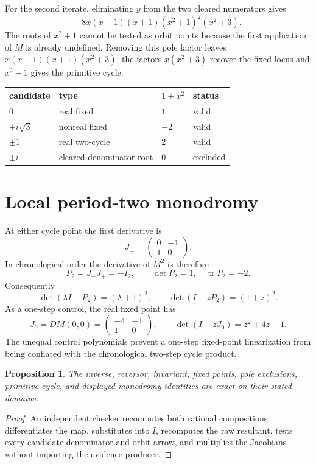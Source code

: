 \documentclass[10pt]{article}
\newtheorem{proposition}{Proposition}
\begin{document}
For the second iterate, eliminating $y$ from the two cleared numerators gives
\[
 -8x(x-1)(x+1)(x^2+1)^2(x^2+3).
\]
The roots of $x^2+1$ cannot be tested as orbit points because the first
application of $M$ is already undefined.  Removing this pole factor leaves
$x(x-1)(x+1)(x^2+3)$: the factors $x(x^2+3)$ recover the fixed locus and
$x^2-1$ gives the primitive cycle.
\begin{center}
\small
\begin{tabular}{llll}
candidate & type & $1+x^2$ & status\\ \hline
$0$ & real fixed & $1$ & valid\\
$\pm i\sqrt3$ & nonreal fixed & $-2$ & valid\\
$\pm1$ & real two-cycle & $2$ & valid\\
$\pm i$ & cleared-denominator root & $0$ & excluded\\
\end{tabular}
\end{center}

\section{Local period-two monodromy}
At either cycle point the first derivative is
\[
 J_\pm=\begin{pmatrix}0&-1\\1&0\end{pmatrix}.
\]
In chronological order the derivative of $M^2$ is therefore
\[
 P_2=J_-J_+=-I_2,\qquad
 \det P_2=1,\quad \operatorname{tr}P_2=-2.
\]
Consequently
\[
 \det(\lambda I-P_2)=(\lambda+1)^2,
 \qquad \det(I-zP_2)=(1+z)^2.
\]
As a one-step control, the real fixed point has
\[
 J_0=DM(0,0)=\begin{pmatrix}-4&-1\\1&0\end{pmatrix},\qquad
 \det(I-zJ_0)=z^2+4z+1.
\]
The unequal control polynomials prevent a one-step fixed-point linearization
from being conflated with the chronological two-step cycle product.

\begin{proposition}
The inverse, reversor, invariant, fixed points, pole exclusions, primitive
cycle, and displayed monodromy identities are exact on their stated domains.
\end{proposition}
\begin{proof}
An independent checker recomputes both rational compositions, differentiates
the map, substitutes into $I$, recomputes the raw resultant, tests every
candidate denominator and orbit arrow, and multiplies the Jacobians without
importing the evidence producer.
\end{proof}
\end{document}
